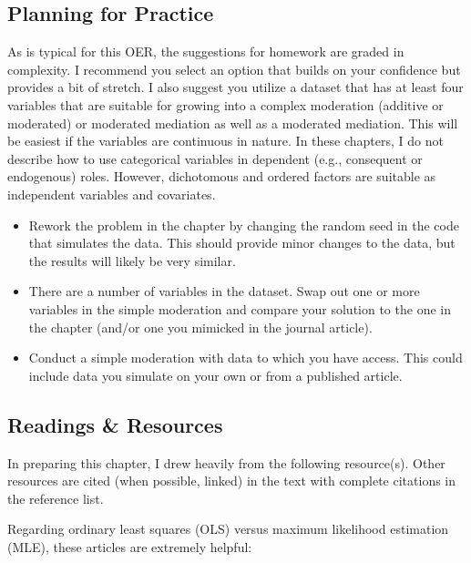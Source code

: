\documentclass[
  11pt,
]{book}
\providecommand{\tightlist}{%
  \setlength{\itemsep}{0pt}\setlength{\parskip}{0pt}}
\begin{document}
\hypertarget{planning-for-practice-6}{%
\subsection{Planning for Practice}\label{planning-for-practice-6}}

As is typical for this OER, the suggestions for homework are graded in complexity. I recommend you select an option that builds on your confidence but provides a bit of stretch. I also suggest you utilize a dataset that has at least four variables that are suitable for growing into a complex moderation (additive or moderated) or moderated mediation as well as a moderated mediation. This will be easiest if the variables are continuous in nature. In these chapters, I do not describe how to use categorical variables in dependent (e.g., consequent or endogenous) roles. However, dichotomous and ordered factors are suitable as independent variables and covariates.

\begin{itemize}
\tightlist
\item
  Rework the problem in the chapter by changing the random seed in the code that simulates the data. This should provide minor changes to the data, but the results will likely be very similar.
\item
  There are a number of variables in the dataset. Swap out one or more variables in the simple moderation and compare your solution to the one in the chapter (and/or one you mimicked in the journal article).
\item
  Conduct a simple moderation with data to which you have access. This could include data you simulate on your own or from a published article.
\end{itemize}

\hypertarget{readings-resources-6}{%
\subsection{Readings \& Resources}\label{readings-resources-6}}

In preparing this chapter, I drew heavily from the following resource(s). Other resources are cited (when possible, linked) in the text with complete citations in the reference list.

Regarding ordinary least squares (OLS) versus maximum likelihood estimation (MLE), these articles are extremely helpful:
\end{document}
